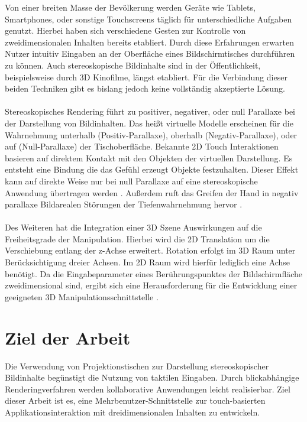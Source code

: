 Von einer breiten Masse der Bevölkerung werden Geräte wie Tablets, Smartphones, oder sonstige Touchscreens täglich für unterschiedliche Aufgaben genutzt. Hierbei haben sich verschiedene Gesten zur Kontrolle von zweidimensionalen Inhalten bereits etabliert. Durch diese Erfahrungen erwarten Nutzer intuitiv Eingaben an der Oberfläche eines Bildschirmtisches durchführen zu können.  Auch stereoskopische Bildinhalte sind in der Öffentlichkeit, beispielsweise durch 3D Kinofilme, längst etabliert. Für die Verbindung dieser beiden Techniken gibt es bislang jedoch keine vollständig akzeptierte Lösung.
\\\\ 
Stereoskopisches Rendering führt zu positiver, negativer, oder null Parallaxe bei der Darstellung von Bildinhalten. Das heißt virtuelle Modelle erscheinen für die Wahrnehmung unterhalb (Positiv-Parallaxe), oberhalb (Negativ-Parallaxe), oder auf (Null-Parallaxe) der Tischoberfläche. Bekannte 2D Touch Interaktionen basieren auf direktem Kontakt mit den Objekten der virtuellen Darstellung. Es entsteht eine Bindung die das Gefühl erzeugt Objekte festzuhalten. Dieser Effekt kann auf direkte Weise nur bei null Parallaxe auf eine stereoskopische Anwendung übertragen werden \cite{bruder:2013}. Außerdem ruft das Greifen der Hand in negativ parallaxe Bildarealen Störungen der Tiefenwahrnehmung hervor \cite{delariviere:2010}.
\\\\
Des Weiteren hat die Integration einer 3D Szene Auswirkungen auf die Freiheitsgrade der Manipulation. Hierbei wird die 2D Translation um die Verschiebung entlang der z-Achse erweitert. Rotation erfolgt im 3D Raum unter Berücksichtigung dreier Achsen. Im 2D Raum wird hierfür lediglich eine Achse benötigt. Da die Eingabeparameter eines Berührungspunktes der Bildschirmfläche zweidimensional sind, ergibt sich eine Herausforderung für die Entwicklung einer geeigneten 3D Manipulationsschnittstelle \cite{martinet:2012}.


\section{Ziel der Arbeit}
\label{sec:ziel_der_arbeit}

Die Verwendung von Projektionstischen zur Darstellung stereoskopischer Bildinhalte begünstigt die Nutzung von taktilen Eingaben. Durch blickabhängige Renderingverfahren werden kollaborative Anwendungen leicht realisierbar. Ziel dieser Arbeit ist es, eine Mehrbenutzer-Schnittstelle zur touch-basierten Applikationsinteraktion mit dreidimensionalen Inhalten zu entwickeln. 